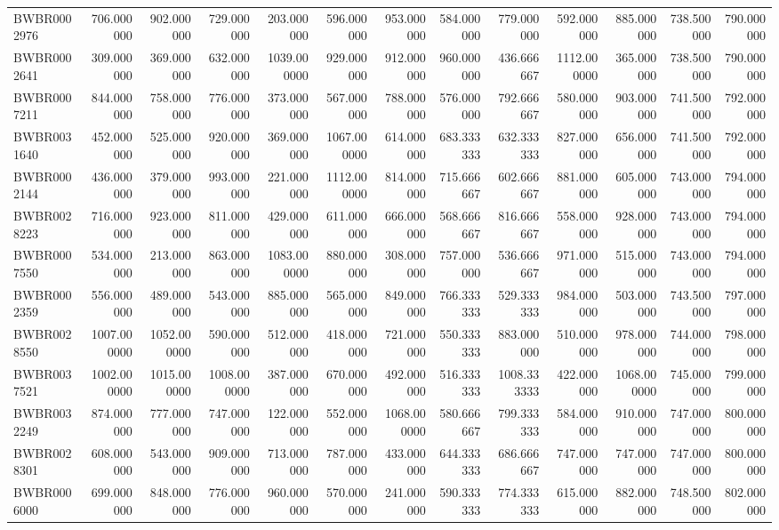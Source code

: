 \begin{longtable}{lrrrrrrrrrrrr}
BWBR0002976 & 706.000000 & 902.000000 & 729.000000 & 203.000000 & 596.000000 & 953.000000 & 584.000000 & 779.000000 & 592.000000 & 885.000000 & 738.500000 & 790.000000 \\
BWBR0002641 & 309.000000 & 369.000000 & 632.000000 & 1039.000000 & 929.000000 & 912.000000 & 960.000000 & 436.666667 & 1112.000000 & 365.000000 & 738.500000 & 790.000000 \\
BWBR0007211 & 844.000000 & 758.000000 & 776.000000 & 373.000000 & 567.000000 & 788.000000 & 576.000000 & 792.666667 & 580.000000 & 903.000000 & 741.500000 & 792.000000 \\
BWBR0031640 & 452.000000 & 525.000000 & 920.000000 & 369.000000 & 1067.000000 & 614.000000 & 683.333333 & 632.333333 & 827.000000 & 656.000000 & 741.500000 & 792.000000 \\
BWBR0002144 & 436.000000 & 379.000000 & 993.000000 & 221.000000 & 1112.000000 & 814.000000 & 715.666667 & 602.666667 & 881.000000 & 605.000000 & 743.000000 & 794.000000 \\
BWBR0028223 & 716.000000 & 923.000000 & 811.000000 & 429.000000 & 611.000000 & 666.000000 & 568.666667 & 816.666667 & 558.000000 & 928.000000 & 743.000000 & 794.000000 \\
BWBR0007550 & 534.000000 & 213.000000 & 863.000000 & 1083.000000 & 880.000000 & 308.000000 & 757.000000 & 536.666667 & 971.000000 & 515.000000 & 743.000000 & 794.000000 \\
BWBR0002359 & 556.000000 & 489.000000 & 543.000000 & 885.000000 & 565.000000 & 849.000000 & 766.333333 & 529.333333 & 984.000000 & 503.000000 & 743.500000 & 797.000000 \\
BWBR0028550 & 1007.000000 & 1052.000000 & 590.000000 & 512.000000 & 418.000000 & 721.000000 & 550.333333 & 883.000000 & 510.000000 & 978.000000 & 744.000000 & 798.000000 \\
BWBR0037521 & 1002.000000 & 1015.000000 & 1008.000000 & 387.000000 & 670.000000 & 492.000000 & 516.333333 & 1008.333333 & 422.000000 & 1068.000000 & 745.000000 & 799.000000 \\
BWBR0032249 & 874.000000 & 777.000000 & 747.000000 & 122.000000 & 552.000000 & 1068.000000 & 580.666667 & 799.333333 & 584.000000 & 910.000000 & 747.000000 & 800.000000 \\
BWBR0028301 & 608.000000 & 543.000000 & 909.000000 & 713.000000 & 787.000000 & 433.000000 & 644.333333 & 686.666667 & 747.000000 & 747.000000 & 747.000000 & 800.000000 \\
BWBR0006000 & 699.000000 & 848.000000 & 776.000000 & 960.000000 & 570.000000 & 241.000000 & 590.333333 & 774.333333 & 615.000000 & 882.000000 & 748.500000 & 802.000000 \\

\end{longtable}
